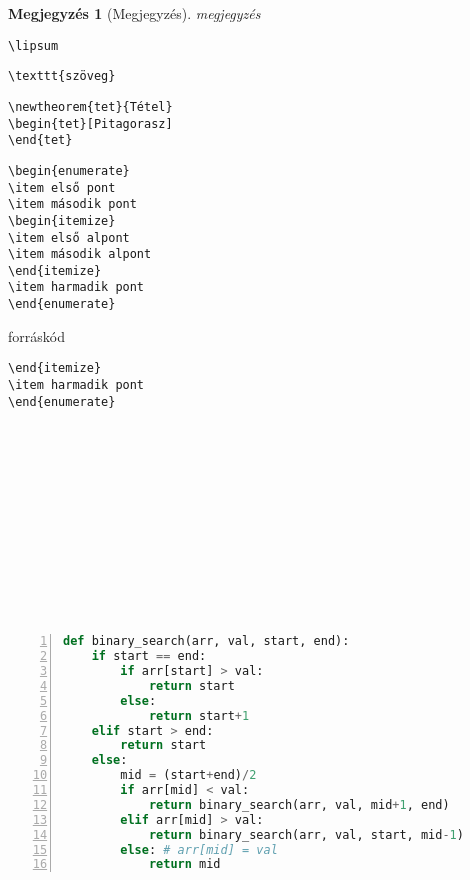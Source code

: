 \documentclass{article}
\newtheorem*{meg}{Megjegyzés}
\theoremstyle{plain}
\newtheorem{tet}{Tétel}
\theoremstyle{definition}
\theoremstyle{remark}
\begin{document}
 \begin{meg}[Megjegyzés]
 megjegyzés
 \end{meg}
 
\verb|\lipsum| 

\verb|\texttt{szöveg}|

\begin{verbatim}
\newtheorem{tet}{Tétel}
\begin{tet}[Pitagorasz]
\end{tet}
\end{verbatim}


\begin{verbatim}
\begin{enumerate}   
\item első pont  
\item második pont  
\begin{itemize}  
\item első alpont  
\item második alpont  
\end{itemize}  
\item harmadik pont  
\end{enumerate}  
\end{verbatim}

\lipsum[1]

\begin{forraskod}\caption{forráskód}
\begin{verbatim}
\end{itemize}  
\item harmadik pont  
\end{enumerate}
\end{verbatim}
\end{forraskod}


\lipsum[1]
\\
\\
\\
\\
\\
\\
\\
\\
\\
\\ 	

\begin{lstlisting}[language=python, tabsize=3, numbers=left, stepnumber=4,
frame=shadowbox, float, caption={bináris keresés}]
def binary_search(arr, val, start, end):
	if start == end:
		if arr[start] > val:
			return start
		else:
			return start+1
	elif start > end:
		return start
	else: 
		mid = (start+end)/2
		if arr[mid] < val:
			return binary_search(arr, val, mid+1, end)
		elif arr[mid] > val:
			return binary_search(arr, val, start, mid-1)
		else: # arr[mid] = val
			return mid
\end{lstlisting}
\end{document}
